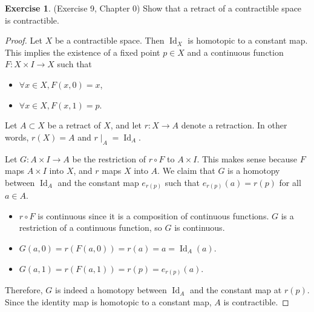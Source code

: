 \documentclass[12pt, psamsfonts]{amsart}
\theoremstyle{definition}
\newtheorem{exer}[thm]{Exercise}
\theoremstyle{remark}
\DeclareMathOperator{\Id}{Id}
\numberwithin{equation}{section}
\begin{document}
\begin{exer}{(Exercise 9, Chapter 0)}
  Show that a retract of a contractible space is contractible.
\end{exer}

\begin{proof}
  Let $X$ be a contractible space.
  Then $\Id_X$ is homotopic to a constant map.
  This implies the existence of a fixed point $p \in X$ and a continuous function $F: X \times I \rightarrow X$ such that
  \begin{itemize}
    \item
      $\forall x \in X, F(x, 0) = x$,
    \item
      $\forall x \in X, F(x, 1) = p$.
  \end{itemize}
  Let $A \subset X$ be a retract of $X$, and let $r: X \rightarrow A$ denote a retraction.
  In other words, $r(X) = A$ and $r \mid_A = \Id_A$.

  Let $G: A \times I \rightarrow A$ be the restriction of $r \circ F$ to $A \times I$.
  This makes sense because $F$ maps $A \times I$ into $X$, and $r$ maps $X$ into $A$.
  We claim that $G$ is a homotopy between $\Id_A$ and the constant map $e_{r(p)}$ such that $e_{r(p)}(a) = r(p)$ for all $a \in A$.

  \begin{itemize}
    \item
      $r \circ F$ is continuous since it is a composition of continuous functions.
      $G$ is a restriction of a continuous function, so $G$ is continuous.
    \item
      $G(a, 0) = r(F(a, 0)) = r(a) = a = \Id_A(a)$.
    \item
      $G(a, 1) = r(F(a, 1)) = r(p) = e_{r(p)}(a)$.
  \end{itemize}

  Therefore, $G$ is indeed a homotopy between $\Id_A$ and the constant map at $r(p)$.
  Since the identity map is homotopic to a constant map, $A$ is contractible.
\end{proof}
\end{document}
